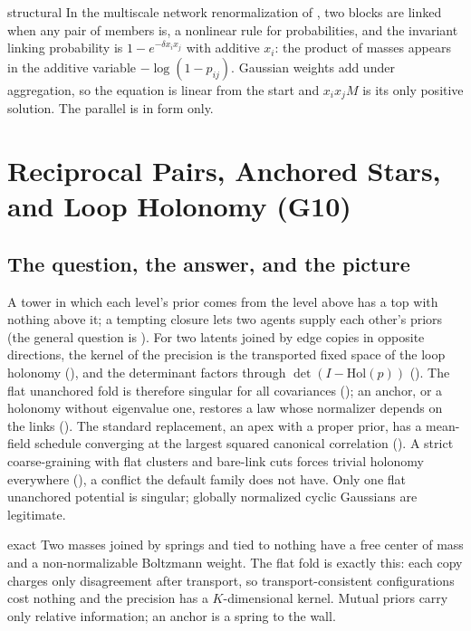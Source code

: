 \begin{analogy}{structural}
In the multiscale network renormalization of \citet{Garuccio2023Multiscale}, two blocks are linked when any pair of
members is, a nonlinear rule for probabilities, and the invariant linking probability is \(1-e^{-\delta x_ix_j}\) with
additive \(x_i\): the product of masses appears in the additive variable \(-\log(1-p_{ij})\). Gaussian weights add under
aggregation, so the equation is linear from the start and \(x_ix_jM\) is its only positive solution. The parallel is in
form only.
\end{analogy}

\section{Reciprocal Pairs, Anchored Stars, and Loop Holonomy (G10)}
\label{comp:sg2-reciprocal}

\subsection{The question, the answer, and the picture}

A tower in which each level's prior comes from the level above has a top with nothing above it; a tempting closure
lets two agents supply each other's priors (the general question is ). For two
latents joined by edge copies in opposite directions, the kernel of the precision is the transported fixed space of
the loop holonomy (), and the determinant factors through \(\det(I-\mathrm{Hol}(p))\)
(). The flat unanchored fold is therefore singular for all covariances
(); an anchor, or a holonomy without eigenvalue one, restores a law whose normalizer
depends on the links (). The standard replacement, an apex with a proper prior,
has a mean-field schedule converging at the largest squared canonical correlation
(). A strict coarse-graining with flat clusters and bare-link cuts forces
trivial holonomy everywhere (), a conflict the default family does not have. Only one
flat unanchored potential is singular; globally normalized cyclic Gaussians are legitimate.

\begin{analogy}{exact}
Two masses joined by springs and tied to nothing have a free center of mass and a non-normalizable Boltzmann weight.
The flat fold is exactly this: each copy charges only disagreement after transport, so transport-consistent
configurations cost nothing and the precision has a \(K\)-dimensional kernel. Mutual priors carry only relative
information; an anchor is a spring to the wall.
\end{analogy}

